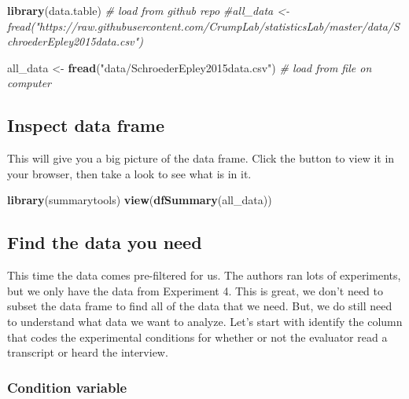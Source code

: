 \documentclass[
]{book}
\newenvironment{Shaded}{\begin{snugshade}}{\end{snugshade}}
\newcommand{\CommentTok}[1]{\textcolor[rgb]{0.56,0.35,0.01}{\textit{#1}}}
\newcommand{\FunctionTok}[1]{\textcolor[rgb]{0.13,0.29,0.53}{\textbf{#1}}}
\newcommand{\NormalTok}[1]{#1}
\newcommand{\OtherTok}[1]{\textcolor[rgb]{0.56,0.35,0.01}{#1}}
\newcommand{\StringTok}[1]{\textcolor[rgb]{0.31,0.60,0.02}{#1}}
\begin{document}
\begin{Shaded}
\begin{Highlighting}[]
\FunctionTok{library}\NormalTok{(data.table)}
\CommentTok{\# load from github repo}
\CommentTok{\#all\_data \textless{}{-} fread("https://raw.githubusercontent.com/CrumpLab/statisticsLab/master/data/SchroederEpley2015data.csv")}

\NormalTok{all\_data }\OtherTok{\textless{}{-}} \FunctionTok{fread}\NormalTok{(}\StringTok{"data/SchroederEpley2015data.csv"}\NormalTok{) }\CommentTok{\# load from file on computer}
\end{Highlighting}
\end{Shaded}

\hypertarget{inspect-data-frame}{%
\subsection{Inspect data frame}\label{inspect-data-frame}}

This will give you a big picture of the data frame. Click the button to view it in your browser, then take a look to see what is in it.

\begin{Shaded}
\begin{Highlighting}[]
\FunctionTok{library}\NormalTok{(summarytools)}
\FunctionTok{view}\NormalTok{(}\FunctionTok{dfSummary}\NormalTok{(all\_data))}
\end{Highlighting}
\end{Shaded}

\hypertarget{find-the-data-you-need}{%
\subsection{Find the data you need}\label{find-the-data-you-need}}

This time the data comes pre-filtered for us. The authors ran lots of experiments, but we only have the data from Experiment 4. This is great, we don't need to subset the data frame to find all of the data that we need. But, we do still need to understand what data we want to analyze. Let's start with identify the column that codes the experimental conditions for whether or not the evaluator read a transcript or heard the interview.

\hypertarget{condition-variable}{%
\subsubsection{Condition variable}\label{condition-variable}}
\end{document}
